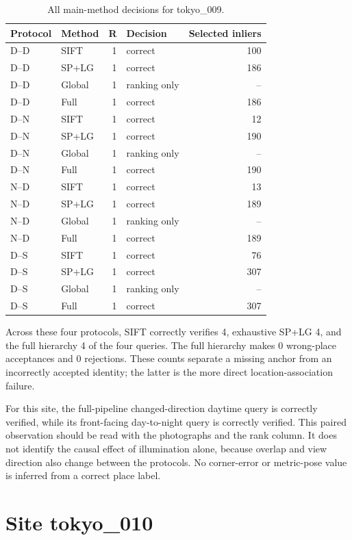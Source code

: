 \begin{table}[H]\centering\small
\caption{All main-method decisions for tokyo\_009.}\label{tab:tokyo-site-9}
\begin{tabular}{llrlr}\toprule
Protocol & Method & R & Decision & Selected inliers \\
\midrule
D--D & SIFT & 1 & correct & 100 \\
D--D & SP+LG & 1 & correct & 186 \\
D--D & Global & 1 & ranking only & -- \\
D--D & Full & 1 & correct & 186 \\
D--N & SIFT & 1 & correct & 12 \\
D--N & SP+LG & 1 & correct & 190 \\
D--N & Global & 1 & ranking only & -- \\
D--N & Full & 1 & correct & 190 \\
N--D & SIFT & 1 & correct & 13 \\
N--D & SP+LG & 1 & correct & 189 \\
N--D & Global & 1 & ranking only & -- \\
N--D & Full & 1 & correct & 189 \\
D--S & SIFT & 1 & correct & 76 \\
D--S & SP+LG & 1 & correct & 307 \\
D--S & Global & 1 & ranking only & -- \\
D--S & Full & 1 & correct & 307 \\
\bottomrule\end{tabular}\end{table}


Across these four protocols, SIFT correctly verifies 4, exhaustive SP+LG 4, and the full hierarchy 4 of the four queries. The full hierarchy makes 0 wrong-place acceptances and 0 rejections. These counts separate a missing anchor from an incorrectly accepted identity; the latter is the more direct location-association failure.

For this site, the full-pipeline changed-direction daytime query is correctly verified, while its front-facing day-to-night query is correctly verified. This paired observation should be read with the photographs and the rank column. It does not identify the causal effect of illumination alone, because overlap and view direction also change between the protocols. No corner-error or metric-pose value is inferred from a correct place label.

\section{Site tokyo\_010}

